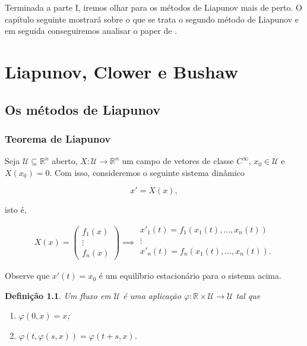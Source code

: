 \documentclass[
	12pt,				%
	openright,			%
	twoside,			%
	a4paper,			%
	english,			%
	french,				%
	spanish,			%
	brazil				%
	]{abntex2}
\newtheorem{definicao}{Definição}[chapter]
\newcommand{\R}{\mathbb{R}}
\newcommand{\U}{\mathcal{U}}
\newcommand{\Fi}{\varphi}
\begin{document}
Terminada a parte I, iremos olhar para os métodos de Liapunov mais de perto.
O capítulo seguinte mostrará sobre o que se trata o segundo método de Liapunov
e em seguida conseguiremos analisar o paper de .

\part{Liapunov, Clower e Bushaw}

\chapter{Os métodos de Liapunov} \label{liapunov}

\section{Teorema de Liapunov}

Seja $\U \subseteq \R^n$ aberto, $X: \U \to \R^n$ um campo de vetores de classe
$C^\infty$, $x_0 \in \U$
e $X(x_0) = 0$. Com isso, consideremos o seguinte sistema dinâmico

\begin{equation}
	x' = X(x),
\end{equation}

isto é,

\begin{equation}
	X(x) =
	\begin{pmatrix}
		f_1(x) \\
		\vdots \\
		f_n(x)
	\end{pmatrix}
	\implies
	\begin{matrix}
		x'_1(t) = f_1(x_1(t), \ldots, x_n(t)) \\
		\vdots \\
		x'_n(t) = f_n(x_1(t), \ldots, x_n(t)). \\
	\end{matrix}
\end{equation}

Observe que $x'(t) = x_0$ é um equilíbrio estacionário para o sistema acima.

\begin{definicao}
	Um fluxo em $\U$ é uma aplicação $\Fi: \R \times \U \to \U$ tal que

	\begin{enumerate}
		\item $\Fi(0, x) = x$;
		\item $\Fi(t, \Fi(s, x)) = \Fi(t + s, x)$.
	\end{enumerate}
\end{definicao}
\end{document}
